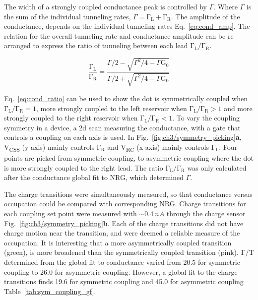 The width of a strongly coupled conductance peak is controlled by $\Gamma$. Where $\Gamma$ is the sum of the individual tunneling rates, $\Gamma=\mathrm{\Gamma_L} + \mathrm{\Gamma_R}$. The amplitude of the conductance, depends on the individual tunneling rates Eq.~\ref{eq:cond_amp}. The relation for the overall tunneling rate and conductance amplitude can be re arranged to express the ratio of tunneling between each lead $\mathrm{\Gamma_L}/\mathrm{\Gamma_R}$.



\begin{equation}\label{eq:cond_ratio}
 \frac{\mathrm{\Gamma_L}}{\mathrm{\Gamma_R}} = 
 \frac
 {\Gamma/2 - \sqrt{\Gamma^2/4 - \Gamma\mathrm{G_0}}}
 {\Gamma/2 + \sqrt{\Gamma^2/4 - \Gamma\mathrm{G_0}}}
\end{equation}


Eq.~\ref{eq:cond_ratio} can be used to show the dot is symmetrically coupled when $\mathrm{\Gamma_L}/\mathrm{\Gamma_R} = 1$, more strongly coupled to the left reservoir when $\mathrm{\Gamma_L}/\mathrm{\Gamma_R} > 1$ and more strongly coupled to the right reservoir when $\mathrm{\Gamma_L}/\mathrm{\Gamma_R} < 1$. To vary the coupling symmetry in a device, a 2d scan measuring the conductance, with a gate that controls a coupling on each axis is used. In Fig.~\ref{fig:ch3/symmetry_picking}\textbf{a}, V\textsubscript{CSS} (y axis) mainly controls $\mathrm{\Gamma_R}$ and V\textsubscript{RC} (x axis) mainly controls $\mathrm{\Gamma_L}$. Four points are picked from symmetric coupling, to asymmetric coupling where the dot is more strongly coupled to the right lead. The ratio $\mathrm{\Gamma_L}/\mathrm{\Gamma_R}$ was only calculated after the conductance global fit to NRG, which determined $\Gamma$. 

The charge transitions were simultaneously measured, so that conductance versus occupation could be compared with corresponding NRG. Charge transitions for each coupling set point were measured with $\sim\qty{0.4}{nA}$ through the charge sensor Fig.~\ref{fig:ch3/symmetry_picking}\textbf{b}. Each of the charge transitions did not have charge motion near the transition, and were deemed a reliable measure of the occupation. It is interesting that a more asymmetrically coupled transition (green), is more broadened than the symmetrically coupled transition (pink). $\mathrm{\Gamma/T}$ determined from the global fit to conductance varied from 20.5 for symmetric coupling to 26.0 for asymmetric coupling. However, a global fit to the charge transitions finds 19.6 for symmetric coupling and 45.0 for asymmetric coupling Table~\ref{tab:sym_coupling_gf}. 

